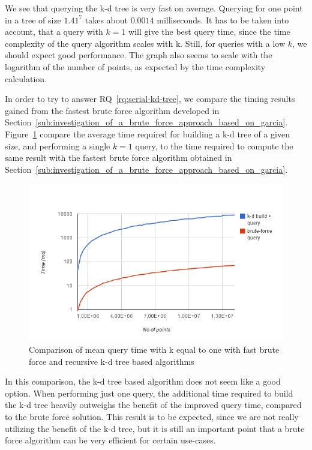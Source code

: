 We see that querying the k-d tree is very fast on average. Querying for one point in a tree of size $1.41^7$ takes about $0.0014$ milliseconds. It has to be taken into account, that a query with $k=1$ will give the best query time, since the time complexity of the query algorithm scales with k. Still, for queries with a low $k$, we should expect good performance. The graph also seems to scale with the logarithm of the number of points, as expected by the time complexity calculation.

In order to try to answer RQ~\ref{rq:serial-kd-tree}, we compare the timing results gained from the fastest brute force algorithm developed in Section~\ref{sub:investigation_of_a_brute_force_approach_based_on_garcia}. Figure~\ref{fig:brute-force-vs-serial-build-query} compare the average time required for building a k-d tree of a given size, and performing a single $k=1$ query, to the time required to compute the same result with the fastest brute force algorithm obtained in Section~\ref{sub:investigation_of_a_brute_force_approach_based_on_garcia}.

\begin{figure}[ht!]
\centering
\includegraphics[width=120mm]{../gfx/brute-force-vs-serial-build-query.png}
\caption{Comparison of mean query time with k equal to one with fast brute force and recursive k-d tree based algorithms}
\label{fig:brute-force-vs-serial-build-query}
\end{figure}

In this comparison, the k-d tree based algorithm does not seem like a good option. When performing just one query, the additional time required to build the k-d tree heavily outweighs the benefit of the improved query time, compared to the brute force solution. This result is to be expected, since we are not really utilizing the benefit of the k-d tree, but it is still an important point that a brute force algorithm can be very efficient for certain use-cases.

